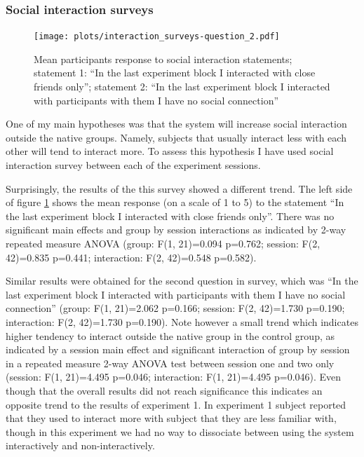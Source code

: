 \documentclass[a4paper,11pt]{article}
\begin{document}
{\subsubsection{Social interaction surveys}

\begin{figure}[!htb]
    \centering
    \texttt{[image: plots/interaction\_surveys-question\_2.pdf]}
    \caption{Mean participants response to social interaction statements; statement 1: ``In the last experiment block I interacted with close friends only''; statement 2: ``In the last experiment block I interacted with participants with them I have no social connection''}\label{plot:interaction_surveys-question_2}
\end{figure}

One of my main hypotheses was that the system will increase social interaction outside the native groups.
Namely, subjects that usually interact less with each other will tend to interact more.
To assess this hypothesis I have used social interaction survey between each of the experiment sessions.

Surprisingly, the results of the this survey showed a different trend.
The left side of figure \ref{plot:interaction_surveys-question_2} shows the mean response (on a scale of 1 to 5) to the statement ``In the last experiment block I interacted with close friends only''.
There was no significant main effects and group by session interactions as indicated by 2-way repeated measure ANOVA (group: F(1, 21)=0.094 p=0.762; session: F(2, 42)=0.835 p=0.441; interaction: F(2, 42)=0.548 p=0.582).

Similar results were obtained for the second question in survey, which was ``In the last experiment block I interacted with participants with them I have no social connection'' (group: F(1, 21)=2.062 p=0.166; session: F(2, 42)=1.730 p=0.190; interaction: F(2, 42)=1.730 p=0.190).
Note however a small trend which indicates higher tendency to interact outside the native group in the control group, as indicated by a session main effect and significant interaction of group by session in a repeated measure 2-way ANOVA test between session one and two only (session: F(1, 21)=4.495 p=0.046; interaction: F(1, 21)=4.495 p=0.046).
Even though that the overall results did not reach significance this indicates an opposite trend to the results of experiment 1.
In experiment 1 subject reported that they used to interact more with subject that they are less familiar with, though in this experiment we had no way to dissociate between using the system interactively and non-interactively.

}
\end{document}
